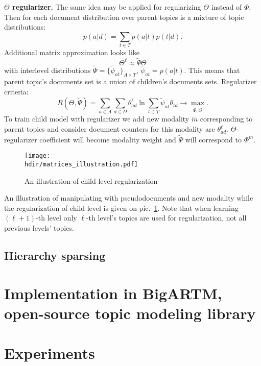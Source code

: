 \documentclass[12pt, twoside]{article}
\newcommand{\hdir}{.}
\begin{document}
\textbf{$\Theta$ regularizer.}
The same idea may be applied for regularizing $\Theta$ instead of $\Phi$. Then for each document distribution over parent topics is a mixture of topic distributions:   %
\[
p(a|d) = \sum_{t \in T} p(a|t) p(t|d).
\]
Additional matrix approximation looks like
\begin{equation}
    \nonumber
    \Theta^\ell \approx \widetilde \Psi \Theta 
\end{equation}
with interlevel distributions $\widetilde \Psi = \{\tilde \psi_{at}\}_{A \times T}$, $\tilde \psi_{at} = p(a|t)$. This means that parent topic's documents set is a union of children's documents sets. Regularizer criteria:
\[
R(\Theta, \widetilde \Psi) = \sum_{a \in A} \sum_{d \in D} \theta^\ell_{ad} \ln \sum_{t \in T} \tilde \psi_{at} \theta_{td} \rightarrow \max_{\widetilde \Psi, \Theta}.
\]
To train child model with regularizer we add new modality $\tilde m$ corresponding to parent topics and consider document counters for this modality are $\theta^\ell_{ad}$. $\Theta$-regularizer coefficient will become modality weight and $\widetilde \Psi$ will correspond to $\Phi^{\tilde m}$.
\begin{figure}[!th]
	\begin{center}
	\texttt{[image: \\hdir/matrices\_illustration.pdf]}
\end{center}
\caption{An illustration of child level regularization}
\label{fg:matrices}
\end{figure}

\vspace{0.5cm}
An illustration of manipulating with pseudodocuments and new modality while the regularization of child level is given on pic.~\ref{fg:matrices}.  Note that when learning $(\ell+1)$-th level only $\ell$-th level's topics are used for regularization, not all previous levels' topics. 




\subsection{Hierarchy sparsing}

\section{Implementation in BigARTM, open-source topic modeling library}

\section{Experiments}
\end{document}
